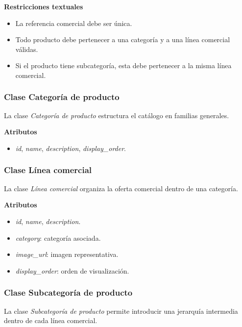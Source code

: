 \textbf{Restricciones textuales}

\begin{itemize}
      \item La referencia comercial debe ser única.
      \item Todo producto debe pertenecer a una categoría y a una línea comercial válidas.
      \item Si el producto tiene subcategoría, esta debe pertenecer a la misma línea comercial.
\end{itemize}

\subsubsection{Clase Categoría de producto}

La clase \textit{Categoría de producto} estructura el catálogo en familias generales.

\textbf{Atributos}

\begin{itemize}
      \item \textit{id}, \textit{name}, \textit{description}, \textit{display\_order}.
\end{itemize}

\subsubsection{Clase Línea comercial}

La clase \textit{Línea comercial} organiza la oferta comercial dentro de una categoría.

\textbf{Atributos}

\begin{itemize}
      \item \textit{id}, \textit{name}, \textit{description}.
      \item \textit{category}: categoría asociada.
      \item \textit{image\_url}: imagen representativa.
      \item \textit{display\_order}: orden de visualización.
\end{itemize}

\subsubsection{Clase Subcategoría de producto}

La clase \textit{Subcategoría de producto} permite introducir una jerarquía intermedia dentro de cada línea comercial.

